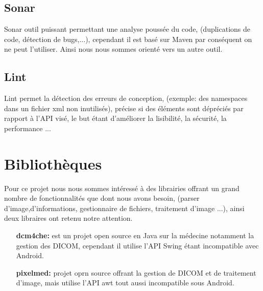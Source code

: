 \subsection{Sonar}
Sonar outil puissant permettant une analyse poussée du code, (duplications de code, détection de bugs,...), cependant il est basé sur Maven par conséquent
on ne peut l'utiliser. Ainsi nous nous sommes orienté vers un autre outil.
\subsection{Lint}
Lint permet la détection des erreurs de conception, (exemple: des namespaces dans un fichier xml non inutilisés), précise si des éléments sont
dépréciés par rapport à l'API visé, le but étant d'améliorer la lisibilité, la sécurité, la performance ...

\section{Bibliothèques}
Pour ce projet nous nous sommes intéressé à des librairies offrant un grand nombre de fonctionnalités que dont nous avons besoin,
(parser d'image,d'informations, gestionnaire de fichiers, traitement d'image ...), ainsi deux libraires ont retenu notre attention.
\begin{itemize}
\item[\textbf{dcm4che:}]  est un projet open source en Java sur la médecine notamment la gestion des DICOM, cependant il utilise l'API Swing
étant incompatible avec Android.
\item[\textbf{pixelmed:}] projet oprn source offrant la gestion de DICOM et de traitement d'image, mais utilise l'API awt tout aussi incompatible sous 
Android.
\end{itemize}
